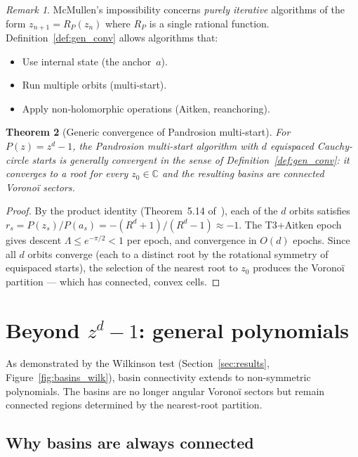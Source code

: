 \documentclass[11pt,a4paper]{article}
\newtheorem{theorem}{Theorem}[section]
\theoremstyle{definition}
\theoremstyle{remark}
\newtheorem{remark}[theorem]{Remark}
\begin{document}
\begin{remark}
McMullen's impossibility concerns \emph{purely iterative} algorithms of the form $z_{n+1} = R_P(z_n)$ where $R_P$ is a single rational function.  Definition~\ref{def:gen_conv} allows algorithms that:
\begin{itemize}[nosep]
\item Use internal state (the anchor~$a$).
\item Run multiple orbits (multi-start).
\item Apply non-holomorphic operations (Aitken, reanchoring).
\end{itemize}
\end{remark}

\begin{theorem}[Generic convergence of Pandrosion multi-start]
\label{thm:gen_conv}
For $P(z) = z^d - 1$, the Pandrosion multi-start algorithm with $d$ equispaced Cauchy-circle starts is generally convergent in the sense of Definition~\ref{def:gen_conv}: it converges to a root for every $z_0 \in \mathbb{C}$ and the resulting basins are connected Vorono\"i sectors.
\end{theorem}

\begin{proof}
By the product identity (Theorem~5.14 of~\cite{Besevic2026g}), each of the $d$ orbits satisfies $r_s = P(z_s)/P(a_s) = -(R^d + 1)/(R^d - 1) \approx -1$.  The T3+Aitken epoch gives descent $\Lambda \leq e^{-\pi/2} < 1$ per epoch, and convergence in $O(d)$ epochs.  Since all $d$ orbits converge (each to a distinct root by the rotational symmetry of equispaced starts), the selection of the nearest root to $z_0$ produces the Vorono\"i partition --- which has connected, convex cells.
\end{proof}

\section{Beyond $z^d - 1$: general polynomials}
\label{sec:general}

As demonstrated by the Wilkinson test (Section~\ref{sec:results}, Figure~\ref{fig:basins_wilk}), basin connectivity extends to non-symmetric polynomials.  The basins are no longer angular Vorono\"i sectors but remain connected regions determined by the nearest-root partition.

\subsection{Why basins are always connected}
\end{document}
